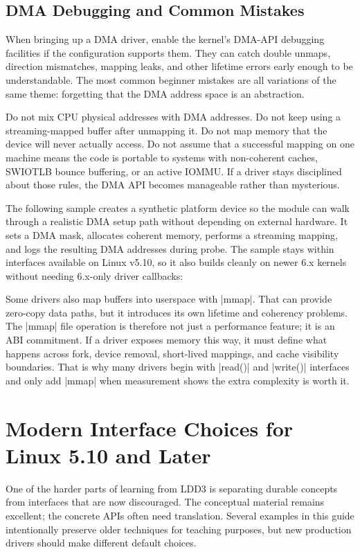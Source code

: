 \documentclass[10pt, oneside]{book}
\begin{document}
\subsection{DMA Debugging and Common Mistakes}
\label{sec:dma_debug}
When bringing up a DMA driver, enable the kernel's DMA-API debugging facilities
if the configuration supports them.
They can catch double unmaps, direction mismatches, mapping leaks, and other
lifetime errors early enough to be understandable.
The most common beginner mistakes are all variations of the same theme:
forgetting that the DMA address space is an abstraction.

Do not mix CPU physical addresses with DMA addresses.
Do not keep using a streaming-mapped buffer after unmapping it.
Do not map memory that the device will never actually access.
Do not assume that a successful mapping on one machine means the code is
portable to systems with non-coherent caches, SWIOTLB bounce buffering, or an
active IOMMU.
If a driver stays disciplined about those rules, the DMA API becomes manageable
rather than mysterious.

The following sample creates a synthetic platform device so the module can walk
through a realistic DMA setup path without depending on external hardware.
It sets a DMA mask, allocates coherent memory, performs a streaming mapping,
and logs the resulting DMA addresses during probe.
The sample stays within interfaces available on Linux v5.10, so it also builds
cleanly on newer 6.x kernels without needing 6.x-only driver callbacks:


Some drivers also map buffers into userspace with \cpp|mmap|.
That can provide zero-copy data paths, but it introduces its own lifetime and
coherency problems.
The \cpp|mmap| file operation is therefore not just a performance feature; it is
an ABI commitment.
If a driver exposes memory this way, it must define what happens across fork,
device removal, short-lived mappings, and cache visibility boundaries.
That is why many drivers begin with \cpp|read()| and \cpp|write()| interfaces
and only add \cpp|mmap| when measurement shows the extra complexity is worth it.

\section{Modern Interface Choices for Linux 5.10 and Later}
\label{sec:modern_interfaces}
One of the harder parts of learning from LDD3 is separating durable concepts
from interfaces that are now discouraged.
The conceptual material remains excellent; the concrete APIs often need
translation.
Several examples in this guide intentionally preserve older techniques for
teaching purposes, but new production drivers should make different default
choices.
\end{document}
